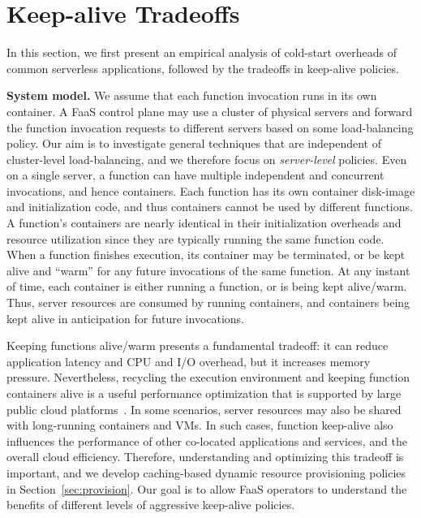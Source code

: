 \section{Keep-alive Tradeoffs}
\label{sec:tradeoffs}


In this section, we first present an empirical analysis of cold-start overheads of common serverless applications, followed by the tradeoffs in keep-alive policies. 

\noindent \textbf{System model.} 
We assume that each function invocation runs in its own container. 
%
A FaaS control plane may use a cluster of physical servers and forward the function invocation requests to different servers based on some load-balancing policy. 
Our aim is to investigate general techniques that are independent of cluster-level load-balancing, and we therefore focus on \emph{server-level} policies. 
Even on a single server, a function can have multiple independent and concurrent invocations, and hence containers. 
Each function has its own container disk-image and initialization code, and thus containers cannot be used by different functions. 
A function's containers are nearly identical in their initialization overheads and resource utilization since they are typically running the same function code. 
%
When a function finishes execution, its container may be terminated, or be kept alive and ``warm'' for any future invocations of the same function. 
%
At any instant of time, each container is either running a function, or is being kept alive/warm. %
%
Thus, server resources are consumed by running containers, and containers being kept alive in anticipation for future invocations. 


Keeping functions alive/warm presents a fundamental tradeoff: it can reduce application latency and CPU and I/O overhead, but it increases memory pressure. 
Nevertheless, recycling the execution environment and keeping function containers alive is a useful performance optimization that is supported by large public cloud platforms~\cite{goog-functions-tricks,aws-warm-predictable,azure-warmup-trigger}. 
%
In some scenarios, server resources may also be shared with long-running containers and VMs. 
In such cases, function keep-alive also influences the performance of other co-located applications and services, and the overall cloud efficiency. 
Therefore, understanding and optimizing this tradeoff is important, and we develop caching-based dynamic resource provisioning policies in Section~\ref{sec:provision}. 
Our goal is to allow FaaS operators to understand the benefits of different levels of aggressive keep-alive policies. 


